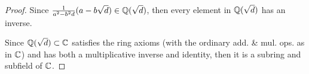\documentclass[../hw3]{subfiles}
\begin{document}
\begin{proof}
	Since $\frac{1}{a^2-b^2 d}(a-b\sqrt{d} )\in \mathbb{Q}(\sqrt{d})$, then every element in $\mathbb{Q}(\sqrt{d})$ has an inverse.

	Since $\mathbb{Q}(\sqrt{d})\subset \mathbb{C}$ satisfies the ring axioms (with the ordinary add. \& mul. ops. as in $\mathbb{C}$) and has both a multiplicative inverse and identity, then it is a subring and subfield of $\mathbb{C}$.
\end{proof}
\end{document}

